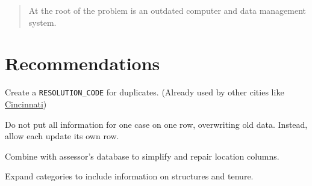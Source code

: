 \documentclass[
]{book}
\begin{document}
\begin{quote}
At the root of the problem is an outdated computer and data management system.
\end{quote}

\hypertarget{recommendations-1}{%
\chapter{Recommendations}\label{recommendations-1}}

Create a \texttt{RESOLUTION\_CODE} for duplicates. (Already used by other cities like \href{https://data.cincinnati-oh.gov/Thriving-Neighborhoods/Code-Enforcement/cncm-znd6}{Cincinnati})

Do not put all information for one case on one row, overwriting old data. Instead, allow each update its own row.

Combine with assessor's database to simplify and repair location columns.

Expand categories to include information on structures and tenure.

  
\end{document}
